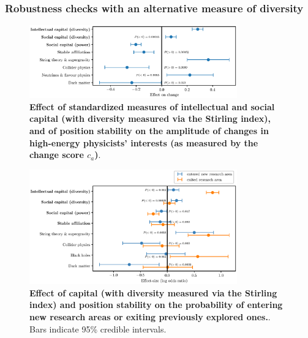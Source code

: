 \documentclass{article}
\begin{document}
\subsubsection{\label{appendix:robustness}Robustness checks with an alternative measure of diversity}

\begin{figure}[H]
    \centering
    \includegraphics[width=0.8\textwidth]{plots/change_score_effects_stirling_magnitude.eps}
    \caption{\textbf{Effect of standardized measures of intellectual and social capital (with diversity measured via the Stirling index), and of position stability on the amplitude of changes in high-energy physicists' interests (as measured by the change score $c_a$)}. }
    \label{fig:change_score_effect_stirling}
\end{figure}

\begin{figure}[H]
    \centering
    \includegraphics[width=0.8\textwidth]{plots/entered_score_effects_stirling.eps}
    \caption{\textbf{Effect of capital (with diversity measured via the Stirling index) and position stability on the probability of entering new research areas or exiting previously explored ones.}. Bars indicate 95\% credible intervals.}
    \label{fig:diversification_score_stirling}
\end{figure}


\end{document}
